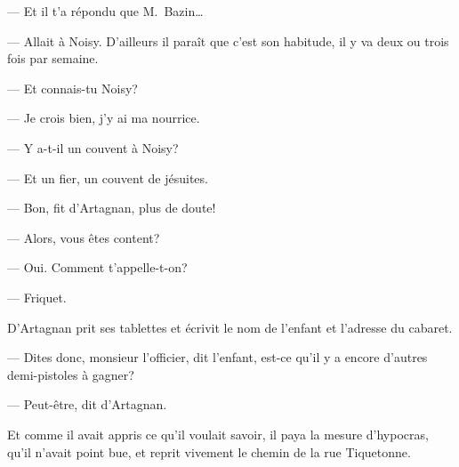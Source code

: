 — Et il t'a répondu que M.~Bazin\dots

— Allait à Noisy. D'ailleurs il paraît que c'est son habitude, il y va deux ou trois fois par semaine.

— Et connais-tu Noisy?

— Je crois bien, j'y ai ma nourrice.

— Y a-t-il un couvent à Noisy?

— Et un fier, un couvent de jésuites.

— Bon, fit d'Artagnan, plus de doute!

— Alors, vous êtes content?

— Oui. Comment t'appelle-t-on?

— Friquet.

D'Artagnan prit ses tablettes et écrivit le nom de l'enfant et l'adresse du cabaret.

— Dites donc, monsieur l'officier, dit l'enfant, est-ce qu'il y a encore d'autres demi-pistoles à gagner?

— Peut-être, dit d'Artagnan.

Et comme il avait appris ce qu'il voulait savoir, il paya la mesure d'hypocras, qu'il n'avait point bue, et reprit vivement le chemin de la rue Tiquetonne.
